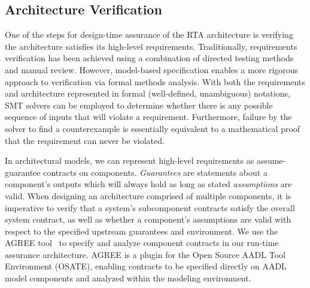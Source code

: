 \subsection{Architecture Verification}


One of the steps for design-time assurance of the RTA architecture is verifying the architecture satisfies its high-level requirements.  Traditionally, requirements verification has been achieved using a combination of directed testing methods and manual review. However, model-based specification enables a more rigorous approach to verification via formal methods analysis. With both the requirements and architecture represented in formal (well-defined, unambiguous) notations, SMT solvers can be employed to determine whether there is any possible sequence of inputs that will violate a requirement.  Furthermore, failure by the solver to find a counterexample is essentially equivalent to a mathematical proof that the requirement can never be violated.  

In architectural models, we can represent high-level requirements as assume-guarantee contracts on components.  \textit{Guarantees} are statements about a component's outputs which will always hold as long as stated \textit{assumptions} are valid.  When designing an architecture comprised of multiple components, it is imperative to verify that a system's subcomponent contracts satisfy the overall system contract, as well as whether a component's assumptions are valid with respect to the specified upstream guarantees and environment.
%
We use the AGREE tool~\cite{agree2012} to specify and analyze component contracts in our run-time assurance architecture.  AGREE is a plugin for the Open Source AADL Tool Environment (OSATE), enabling contracts to be specified directly on AADL model components and analyzed within the modeling environment.


